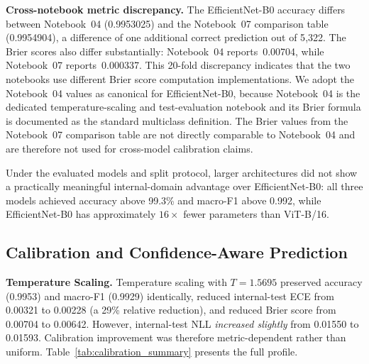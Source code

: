 \documentclass[conference]{IEEEtran}
\begin{document}
\textbf{Cross-notebook metric discrepancy.}
The EfficientNet-B0 accuracy differs between Notebook~04 (0.9953025)
and the Notebook~07 comparison table (0.9954904), a difference of one
additional correct prediction out of 5{,}322. The Brier scores also
differ substantially: Notebook~04 reports~0.00704, while Notebook~07
reports~0.000337. This 20-fold discrepancy indicates that the two
notebooks use different Brier score computation implementations. We
adopt the Notebook~04 values as canonical for EfficientNet-B0, because
Notebook~04 is the dedicated temperature-scaling and test-evaluation
notebook and its Brier formula is documented as the standard
multiclass definition. The Brier values from the Notebook~07
comparison table are not directly comparable to Notebook~04 and are
therefore not used for cross-model calibration claims.

Under the evaluated models and split protocol, larger architectures
did not show a practically meaningful internal-domain advantage over
EfficientNet-B0: all three models achieved accuracy above 99.3\% and
macro-F1 above 0.992, while EfficientNet-B0 has approximately
$16\times$ fewer parameters than ViT-B/16.

\subsection{Calibration and Confidence-Aware Prediction}

\textbf{Temperature Scaling.}
Temperature scaling with $T\!=\!1.5695$ preserved accuracy (0.9953)
and macro-F1 (0.9929) identically, reduced internal-test ECE from
0.00321 to 0.00228 (a 29\% relative reduction), and reduced Brier
score from 0.00704 to 0.00642. However, internal-test NLL
\textit{increased slightly} from 0.01550 to 0.01593. Calibration
improvement was therefore metric-dependent rather than uniform.
Table~\ref{tab:calibration_summary} presents the full profile.
\end{document}
